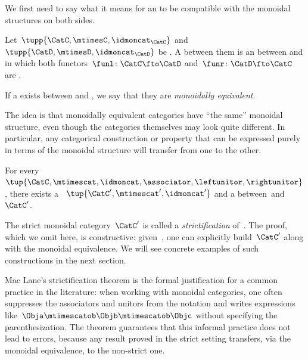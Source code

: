 We first need to say what it means for an  to be compatible with the monoidal structures on both sides.

\begin{ctdefinition}
    \label{def:monoidal-equivalence}
    Let~$\tupp{\CatC,\mtimesC,\idmoncat_{\CatC}}$ and~$\tupp{\CatD,{{\mtimesD}},\idmoncat_{\CatD}}$ be .
    A  between them is an  between \CatC and \CatD in which both functors~$\funl \colon \CatC \fto \CatD$ and~$\funr \colon \CatD \fto \CatC$ are .

    If a  exists between \CatC and \CatD, we say that they are \emph{monoidally equivalent}.
\end{ctdefinition}

The idea is that monoidally equivalent categories have ``the same'' monoidal structure, even though the categories themselves may look quite different.
In particular, any categorical construction or property that can be expressed purely in terms of the monoidal structure will transfer from one to the other.

\begin{theorem}
    \label{thm:maclane-strictification}
    For every ~$\tup{\CatC, \mtimescat, \idmoncat, \associator, \leftunitor, \rightunitor}$, there exists a ~$\tup{\CatC', \mtimescat', \idmoncat'}$ and a  between~\CatC and~$\CatC'$.
\end{theorem}

The strict monoidal category~$\CatC'$ is called a \emph{strictification} of~\CatC.
The proof, which we omit here, is constructive: given~\CatC, one can explicitly build~$\CatC'$ along with the monoidal equivalence.
We will see concrete examples of such constructions in the next section.

\begin{remark}
    Mac Lane's strictification theorem is the formal justification for a common practice in the literature: when working with monoidal categories, one often suppresses the associators and unitors from the notation and writes expressions like~$\Obja \mtimescatob \Objb \mtimescatob \Objc$ without specifying the parenthesization.
    The theorem guarantees that this informal practice does not lead to errors, because any result proved in the strict setting transfers, via the monoidal equivalence, to the non-strict one.
\end{remark}

